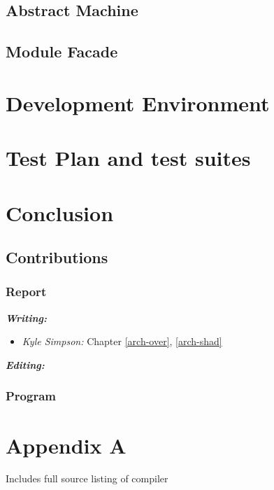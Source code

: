 \documentclass{l3proj}
\begin{document}
\section{Abstract Machine}
\label{arch-abs}

\section{Module Facade}
\label{arch-module}

\chapter{Development Environment}
\label{dev}

\chapter{Test Plan and test suites}
\label{test}

\chapter{Conclusion}
\label{conc}

\section{Contributions}
\label{cont}

\subsection{Report}
\label{cont-report}

\textit{\textbf{Writing:}}
\begin{itemize}
\item \emph{Kyle Simpson:} Chapter \ref{arch-over}, \ref{arch-shad}
\end{itemize}
\textit{\textbf{Editing:}}
\subsection{Program}
\label{cont-prog}

\chapter{Appendix A}
\label{appa}

Includes full source listing of compiler




\end{document}
